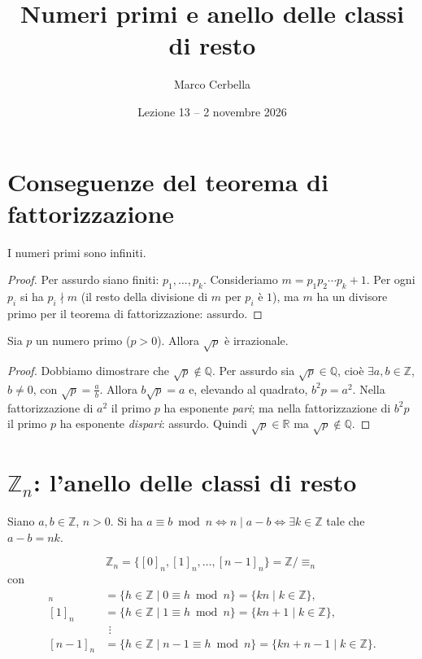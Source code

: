 \documentclass[11pt,a4paper]{article}
\title{Numeri primi e anello delle classi di resto}
\author{Marco Cerbella}
\date{Lezione 13 -- 2 novembre 2026}
\begin{document}
\maketitle

\section{Conseguenze del teorema di fattorizzazione}

\begin{proposizione}
I numeri primi sono infiniti.
\end{proposizione}

\begin{proof}
Per assurdo siano finiti: $p_1, \dots, p_k$. Consideriamo $m = p_1 p_2 \cdots p_k + 1$. Per ogni $p_i$ si ha $p_i \nmid m$ (il resto della divisione di $m$ per $p_i$ è $1$), ma $m$ ha un divisore primo per il teorema di fattorizzazione: assurdo.
\end{proof}

\begin{proposizione}
Sia $p$ un numero primo ($p > 0$). Allora $\sqrt{p}$ è irrazionale.
\end{proposizione}

\begin{proof}
Dobbiamo dimostrare che $\sqrt{p} \notin \mathbb{Q}$. Per assurdo sia $\sqrt{p} \in \mathbb{Q}$, cioè $\exists a, b \in \mathbb{Z}$, $b \neq 0$, con $\sqrt{p} = \frac{a}{b}$. Allora $b\sqrt{p} = a$ e, elevando al quadrato, $b^2 p = a^2$. Nella fattorizzazione di $a^2$ il primo $p$ ha esponente \emph{pari}; ma nella fattorizzazione di $b^2 p$ il primo $p$ ha esponente \emph{dispari}: assurdo. Quindi $\sqrt{p} \in \mathbb{R}$ ma $\sqrt{p} \notin \mathbb{Q}$.
\end{proof}

\section{$\mathbb{Z}_n$: l'anello delle classi di resto}

Siano $a, b \in \mathbb{Z}$, $n > 0$. Si ha $a \equiv b \bmod n \iff n \mid a - b \iff \exists k \in \mathbb{Z}$ tale che $a - b = nk$.

\[
  \mathbb{Z}_n = \{[0]_n, [1]_n, \dots, [n-1]_n\} = \mathbb{Z}/{\equiv_n}
\]
con
\begin{align*}
  [0]_n &= \{h \in \mathbb{Z} \mid 0 \equiv h \bmod n\} = \{kn \mid k \in \mathbb{Z}\},\\
  [1]_n &= \{h \in \mathbb{Z} \mid 1 \equiv h \bmod n\} = \{kn + 1 \mid k \in \mathbb{Z}\},\\
  &\ \,\vdots\\
  [n-1]_n &= \{h \in \mathbb{Z} \mid n-1 \equiv h \bmod n\} = \{kn + n - 1 \mid k \in \mathbb{Z}\}.
\end{align*}
\end{document}
